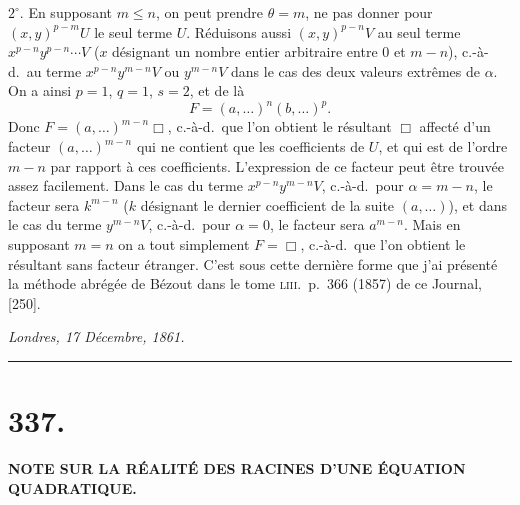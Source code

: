 \documentclass[11pt,a4paper]{article}
\begin{document}
\medskip

\noindent $2^{\circ}$. En supposant $m\leq n$, on peut prendre $\theta=m$, ne pas donner pour $(x,y)^{p-m}U$ le seul terme $U$. R\'{e}duisons aussi $(x,y)^{p-n}V$ au seul terme $x^{p-n}y^{p-n}\cdots V$ ($x$ d\'{e}signant un nombre entier arbitraire entre $0$ et $m-n$), c.-\`{a}-d.\ au terme $x^{p-n}y^{m-n}V$ ou $y^{m-n}V$ dans le cas des deux valeurs extr\^{e}mes de $\alpha$. On a ainsi $p=1$, $q=1$, $s=2$, et de l\`{a}
\[
F=(a,\ldots)^n(b,\ldots)^p.
\]
Donc $F=(a,\ldots)^{m-n}\Box$, c.-\`{a}-d.\ que l'on obtient le r\'{e}sultant $\Box$ affect\'{e} d'un facteur $(a,\ldots)^{m-n}$ qui ne contient que les coefficients de $U$, et qui est de l'ordre $m-n$ par rapport \`{a} ces coefficients. L'expression de ce facteur peut \^{e}tre trouv\'{e}e assez facilement. Dans le cas du terme $x^{p-n}y^{m-n}V$, c.-\`{a}-d.\ pour $\alpha=m-n$, le facteur sera $k^{m-n}$ ($k$ d\'{e}signant le dernier coefficient de la suite $(a,\ldots)$), et dans le cas du terme $y^{m-n}V$, c.-\`{a}-d.\ pour $\alpha=0$, le facteur sera $a^{m-n}$. Mais en supposant $m=n$ on a tout simplement $F=\Box$, c.-\`{a}-d.\ que l'on obtient le r\'{e}sultant sans facteur \'{e}tranger. C'est sous cette derni\`{e}re forme que j'ai pr\'{e}sent\'{e} la m\'{e}thode abr\'{e}g\'{e}e de B\'{e}zout dans le tome \textsc{liii}.\ p.\ 366 (1857) de ce Journal, [250].

\bigskip

\noindent\textit{Londres, 17 D\'{e}cembre, 1861.}

\bigskip

\noindent\rule{\textwidth}{0.4pt}
\vspace{1em}

\section*{337.}

\begin{center}
\textbf{NOTE SUR LA R\'EALIT\'E DES RACINES D'UNE \'EQUATION QUADRATIQUE.}
\end{center}


\bigskip
\end{document}

